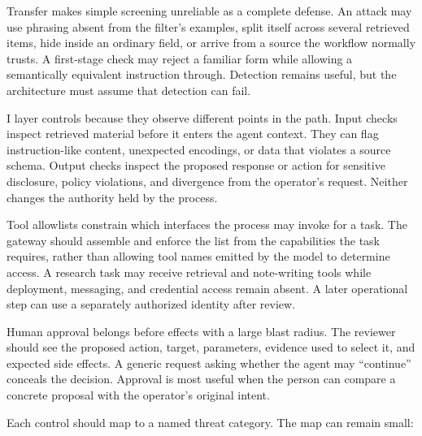 Transfer makes simple screening unreliable as a complete defense. An attack may use phrasing absent from the filter's examples, split itself across several retrieved items, hide inside an ordinary field, or arrive from a source the workflow normally trusts. A first-stage check may reject a familiar form while allowing a semantically equivalent instruction through. Detection remains useful, but the architecture must assume that detection can fail.

I layer controls because they observe different points in the path. Input checks inspect retrieved material before it enters the agent context. They can flag instruction-like content, unexpected encodings, or data that violates a source schema. Output checks inspect the proposed response or action for sensitive disclosure, policy violations, and divergence from the operator's request. Neither changes the authority held by the process.

Tool allowlists constrain which interfaces the process may invoke for a task. The gateway should assemble and enforce the list from the capabilities the task requires, rather than allowing tool names emitted by the model to determine access. A research task may receive retrieval and note-writing tools while deployment, messaging, and credential access remain absent. A later operational step can use a separately authorized identity after review.

Human approval belongs before effects with a large blast radius. The reviewer should see the proposed action, target, parameters, evidence used to select it, and expected side effects. A generic request asking whether the agent may ``continue'' conceals the decision. Approval is most useful when the person can compare a concrete proposal with the operator's original intent.

Each control should map to a named threat category. The map can remain small:

